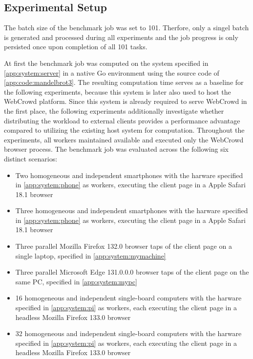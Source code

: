 \subsection{Experimental Setup}
The batch size of the benchmark job was set to 101. Therfore, only a singel batch is generated and processed during all experiments and the job progress is only persisted once upon completion of all 101 tasks.

At first the benchmark job was computed on the system specified in \autoref{app:system:server} in a native Go environment using the source code of \autoref{app:code:mandelbrot3}. The resulting computation time serves as a baseline for the following experiments, because this system is later also used to host the WebCrowd platform. Since this system is already required to serve WebCrowd in the first place, the following experiments additionally investigate whether distributing the workload to external clients provides a performance advantage compared to utilizing the existing host system for computation. Throughout the experiments, all workers maintained available and executed only the WebCrowd browser process. The benchmark job was evaluated across the following six distinct scenarios:
\begin{itemize}
    \item Two homogeneous and independent smartphones with the harware specified in \autoref{app:system:phone} as workers, executing the client page in a Apple Safari 18.1 \cite{evaluation:safari} browser
    \item Three homogeneous and independent smartphones with the harware specified in \autoref{app:system:phone} as workers, executing the client page in a Apple Safari 18.1 \cite{evaluation:safari} browser
    \item Three parallel Mozilla Firefox 132.0 \cite{background:firefox} browser taps of the client page on a single laptop, specified in \autoref{app:system:mymachine}
    \item Three parallel Microsoft Edge 131.0.0.0 \cite{evaluation:edge} browser taps of the client page on the same \acs{PC}, specified in \autoref{app:system:mypc}
    \item 16 homogeneous and independent single-board computers with the harware specified in \autoref{app:system:pi} as workers, each executing the client page in a headless Mozilla Firefox 133.0 \cite{background:firefox2} browser
    \item 32 homogeneous and independent single-board computers with the harware specified in \autoref{app:system:pi} as workers, each executing the client page in a headless Mozilla Firefox 133.0 \cite{background:firefox2} browser
\end{itemize}

